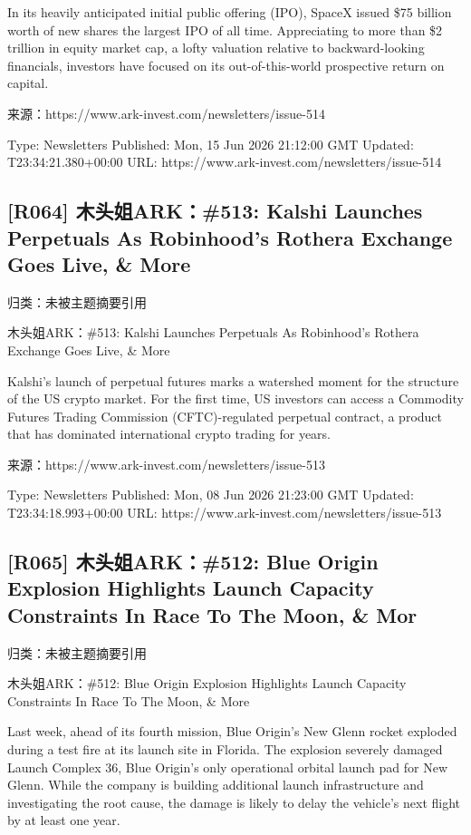 \documentclass[11pt]{ctexart}
\begin{document}
In its heavily anticipated initial public offering (IPO), SpaceX issued \$75 billion worth of new shares the largest IPO of all time. Appreciating to more than \$2 trillion in equity market cap, a lofty valuation relative to backward-looking financials, investors have focused on its out-of-this-world prospective return on capital.

来源：https://www.ark-invest.com/newsletters/issue-514

Type: Newsletters Published: Mon, 15 Jun 2026 21:12:00 GMT Updated: T23:34:21.380+00:00 URL: https://www.ark-invest.com/newsletters/issue-514

\subsection{[R064] 木头姐ARK：\#513: Kalshi Launches Perpetuals As Robinhood’s Rothera Exchange Goes Live, \& More}
{\small\color{refgray}归类：未被主题摘要引用}

木头姐ARK：\#513: Kalshi Launches Perpetuals As Robinhood’s Rothera Exchange Goes Live, \& More

Kalshi's launch of perpetual futures marks a watershed moment for the structure of the US crypto market. For the first time, US investors can access a Commodity Futures Trading Commission (CFTC)-regulated perpetual contract, a product that has dominated international crypto trading for years.

来源：https://www.ark-invest.com/newsletters/issue-513

Type: Newsletters Published: Mon, 08 Jun 2026 21:23:00 GMT Updated: T23:34:18.993+00:00 URL: https://www.ark-invest.com/newsletters/issue-513

\subsection{[R065] 木头姐ARK：\#512: Blue Origin Explosion Highlights Launch Capacity Constraints In Race To The Moon, \& Mor}
{\small\color{refgray}归类：未被主题摘要引用}

木头姐ARK：\#512: Blue Origin Explosion Highlights Launch Capacity Constraints In Race To The Moon, \& More

Last week, ahead of its fourth mission, Blue Origin’s New Glenn rocket exploded during a test fire at its launch site in Florida. The explosion severely damaged Launch Complex 36, Blue Origin’s only operational orbital launch pad for New Glenn. While the company is building additional launch infrastructure and investigating the root cause, the damage is likely to delay the vehicle’s next flight by at least one year.
\end{document}
